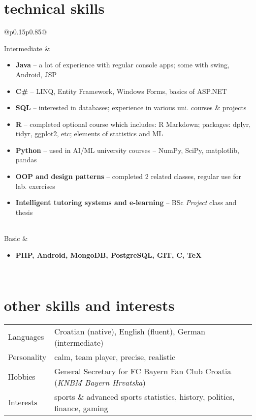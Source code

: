\documentclass[a4paper]{article}
\makeatletter
\newlength{\tablewidth}
\newenvironment{skills}{%
\setlength{\tablewidth}{\linewidth}
\addtolength{\tablewidth}{-2\tabcolsep}
\begin{tabular}{@{}p{0.15\tablewidth}p{0.85\tablewidth}@{}}
}{%
\end{tabular}
}
\makeatother
\begin{document}
\section{technical skills}
\begin{skills}
    Intermediate &
    \begin{itemize}
        \item \textbf{Java} -- a lot of experience with regular console apps; some with swing, Android, JSP
        \item \textbf{C\#} -- LINQ, Entity Framework, Windows Forms, basics of ASP.NET
        \item \textbf{SQL} -- interested in databases; experience in various uni. courses \& projects
        \item \textbf{R} -- completed optional course which includes:
        \newline
        R Markdown; packages: dplyr, tidyr, ggplot2, etc; elements of statistics and ML
        \item \textbf{Python} -- used in AI/ML university courses -- NumPy, SciPy, matplotlib, pandas
        \item \textbf{OOP and design patterns} -- completed 2 related classes, regular use for lab. exercises
        \item \textbf{Intelligent tutoring systems and e-learning} -- BSc \textit{Project} class and thesis
    \end{itemize}\\
    Basic &
    \begin{itemize}
        \item \textbf{PHP, Android, MongoDB, PostgreSQL, GIT, C, TeX}
    \end{itemize} \\
\end{skills}


\section{other skills and interests}
\begin{skills}
	Languages & Croatian (native), English (fluent), German (intermediate) \\
	Personality & calm, team player, precise, realistic \\
	Hobbies & General Secretary for  FC Bayern Fan Club Croatia (\textit{KNBM Bayern Hrvatska})\\
	Interests & sports \& advanced sports statistics, history, politics, finance, gaming \\
\end{skills}
\end{document}
